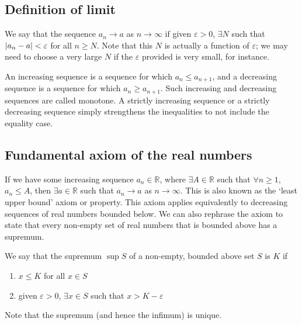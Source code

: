 \subsection{Definition of limit}
\begin{definition}
	We say that the sequence \(a_n \to a\) as \(n \to \infty\) if given \(\varepsilon > 0\), \(\exists N\) such that \(\abs{a_n - a} < \varepsilon\) for all \(n \geq N\).
	Note that this \(N\) is actually a function of \(\varepsilon\); we may need to choose a very large \(N\) if the \(\varepsilon\) provided is very small, for instance.
\end{definition}
\begin{definition}
	An increasing sequence is a sequence for which \(a_n \leq a_{n+1}\), and a decreasing sequence is a sequence for which \(a_n \geq a_{n+1}\).
	Such increasing and decreasing sequences are called monotone.
	A strictly increasing sequence or a strictly decreasing sequence simply strengthens the inequalities to not include the equality case.
\end{definition}

\subsection{Fundamental axiom of the real numbers}
If we have some increasing sequence \(a_n \in \mathbb R\), where \(\exists A \in \mathbb R\) such that \(\forall n \geq 1\), \(a_n \leq A\), then \(\exists a \in \mathbb R\) such that \(a_n \to a\) as \(n \to \infty\).
This is also known as the `least upper bound' axiom or property.
This axiom applies equivalently to decreasing sequences of real numbers bounded below.
We can also rephrase the axiom to state that every non-empty set of real numbers that is bounded above has a supremum.
\begin{definition}
	We say that the supremum \(\sup S\) of a non-empty, bounded above set \(S\) is \(K\) if
	\begin{enumerate}
		\item \(x \leq K\) for all \(x \in S\)
		\item given \(\varepsilon > 0\), \(\exists x \in S\) such that \(x > K - \varepsilon\)
	\end{enumerate}
\end{definition}
Note that the supremum (and hence the infimum) is unique.

